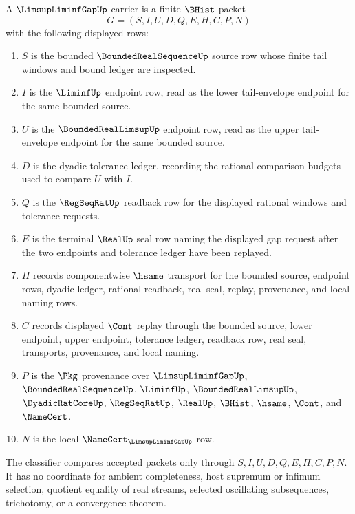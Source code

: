 \begin{definition}
\label{def:limsup-liminf-gap-carrier}
A $\LimsupLiminfGapUp$ carrier is a finite $\BHist$ packet
$$
G=(S,I,U,D,Q,E,H,C,P,N)
$$
with the following displayed rows:
\begin{enumerate}
\item $S$ is the bounded $\BoundedRealSequenceUp$ source row whose finite tail windows and bound ledger are inspected.
\item $I$ is the $\LiminfUp$ endpoint row, read as the lower tail-envelope endpoint for the same bounded source.
\item $U$ is the $\BoundedRealLimsupUp$ endpoint row, read as the upper tail-envelope endpoint for the same bounded source.
\item $D$ is the dyadic tolerance ledger, recording the rational comparison budgets used to compare $U$ with $I$.
\item $Q$ is the $\RegSeqRatUp$ readback row for the displayed rational windows and tolerance requests.
\item $E$ is the terminal $\RealUp$ seal row naming the displayed gap request after the two endpoints and tolerance ledger have been replayed.
\item $H$ records componentwise $\hsame$ transport for the bounded source, endpoint rows, dyadic ledger, rational readback, real seal, replay, provenance, and local naming rows.
\item $C$ records displayed $\Cont$ replay through the bounded source, lower endpoint, upper endpoint, tolerance ledger, readback row, real seal, transports, provenance, and local naming.
\item $P$ is the $\Pkg$ provenance over $\LimsupLiminfGapUp$, $\BoundedRealSequenceUp$, $\LiminfUp$, $\BoundedRealLimsupUp$, $\DyadicRatCoreUp$, $\RegSeqRatUp$, $\RealUp$, $\BHist$, $\hsame$, $\Cont$, and $\NameCert$.
\item $N$ is the local $\NameCert_{\LimsupLiminfGapUp}$ row.
\end{enumerate}
The classifier compares accepted packets only through $S,I,U,D,Q,E,H,C,P,N$. It has no coordinate for ambient completeness, host supremum or infimum selection, quotient equality of real streams, selected oscillating subsequences, trichotomy, or a convergence theorem.
\end{definition}

